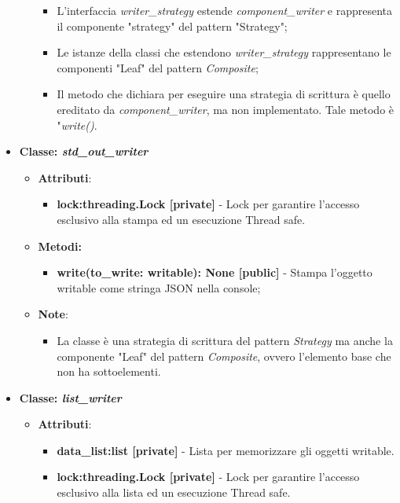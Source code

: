 \begin{itemize}
\begin{itemize}
\begin{itemize}
            \item L'interfaccia \textit{writer\_strategy} estende \textit{component\_writer} e rappresenta il componente "strategy" del pattern "Strategy";
            \item Le istanze della classi che estendono \textit{writer\_strategy} rappresentano le componenti "Leaf" del pattern \textit{Composite}; 
            \item Il metodo che dichiara per eseguire una strategia di scrittura è quello ereditato da \textit{component\_writer}, ma non implementato. Tale metodo è "\textit{write()}.
        \end{itemize}
    \end{itemize}
    \item{\textbf{Classe: \textit{std\_out\_writer}}}
    \begin{itemize}
    \item\textbf{Attributi}:
        \begin{itemize}
        \item \textbf{lock:threading.Lock [private]} - Lock per garantire l'accesso esclusivo alla stampa ed un esecuzione Thread safe.
    \end{itemize}
    \item \textbf{Metodi: }
    \begin{itemize}
        \item \textbf{write(to\_write: writable): None [public]} - Stampa l'oggetto writable come stringa JSON nella console;
    \end{itemize}
    \item\textbf{Note}:
        \begin{itemize}
            \item La classe è una strategia di scrittura del pattern \textit{Strategy} ma anche la componente "Leaf" del pattern \textit{Composite}, ovvero l'elemento base che non ha sottoelementi.
        \end{itemize}
    \end{itemize}
    \item{\textbf{Classe: \textit{list\_writer}}}
    \begin{itemize}
    \item\textbf{Attributi}:
        \begin{itemize}
        \item \textbf{data\_list:list [private]} - Lista per memorizzare gli oggetti writable.
        \item \textbf{lock:threading.Lock [private]} - Lock per garantire l'accesso esclusivo alla lista ed un esecuzione Thread safe.

\end{itemize}
\end{itemize}
\end{itemize}
